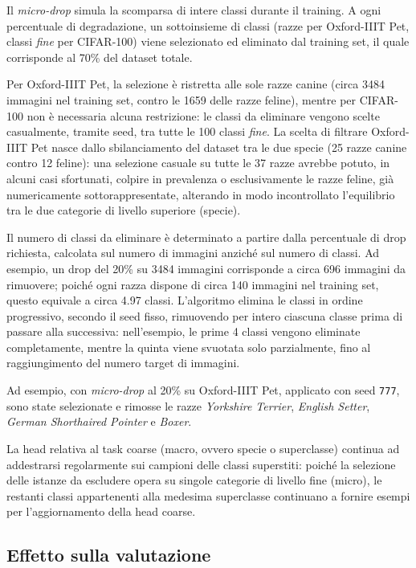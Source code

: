 Il \emph{micro-drop} simula la scomparsa di intere classi durante il training. A ogni percentuale di degradazione, un sottoinsieme di classi (razze per Oxford-IIIT Pet, classi \emph{fine} per CIFAR-100) viene selezionato ed eliminato dal training set, il quale corrisponde al 70\% del dataset totale.

Per Oxford-IIIT Pet, la selezione è ristretta alle sole razze canine (circa 3484 immagini nel training set, contro le 1659 delle razze feline), mentre per CIFAR-100 non è necessaria alcuna restrizione: le classi da eliminare vengono scelte casualmente, tramite seed, tra tutte le 100 classi \textit{fine}. La scelta di filtrare Oxford-IIIT Pet nasce dallo sbilanciamento del dataset tra le due specie (25 razze canine contro 12 feline): una selezione casuale su tutte le 37 razze avrebbe potuto, in alcuni casi sfortunati, colpire in prevalenza o esclusivamente le razze feline, già numericamente sottorappresentate, alterando in modo incontrollato l'equilibrio tra le due categorie di livello superiore (specie).

Il numero di classi da eliminare è determinato a partire dalla percentuale di drop richiesta, calcolata sul numero di immagini anziché sul numero di classi. Ad esempio, un drop del 20\% su 3484 immagini corrisponde a circa 696 immagini da rimuovere; poiché ogni razza dispone di circa 140 immagini nel training set, questo equivale a circa 4.97 classi. L'algoritmo elimina le classi in ordine progressivo, secondo il seed fisso, rimuovendo per intero ciascuna classe prima di passare alla successiva: nell'esempio, le prime 4 classi vengono eliminate completamente, mentre la quinta viene svuotata solo parzialmente, fino al raggiungimento del numero target di immagini.

Ad esempio, con \emph{micro-drop} al 20\% su Oxford-IIIT Pet, applicato con seed \texttt{777}, sono state selezionate e rimosse le razze \emph{Yorkshire Terrier}, \emph{English Setter}, \emph{German Shorthaired Pointer} e \emph{Boxer}. 


La head relativa al task coarse (macro, ovvero specie o superclasse) continua ad addestrarsi regolarmente sui campioni delle classi superstiti: poiché la selezione delle istanze da escludere opera su singole categorie di livello fine (micro), le restanti classi appartenenti alla medesima superclasse continuano a fornire esempi per l'aggiornamento della head coarse.

\subsection*{Effetto sulla valutazione}

